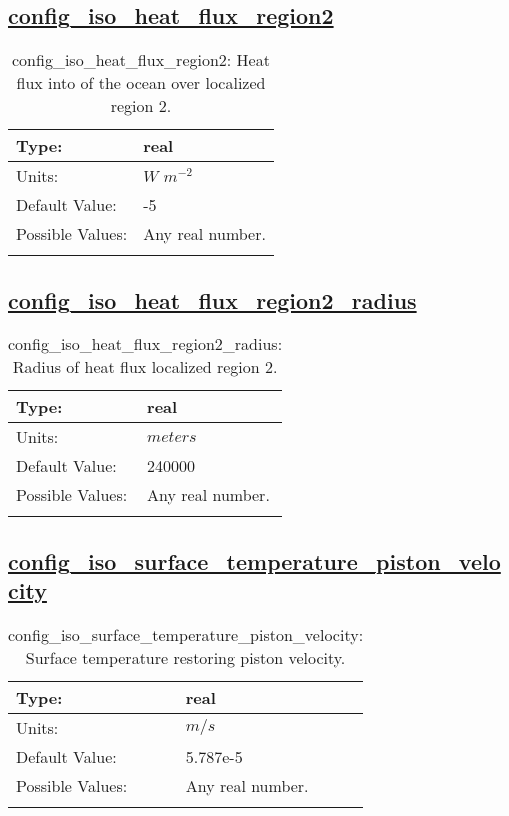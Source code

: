 \subsection[config\_iso\_heat\_flux\_region2]{\hyperref[sec:nm_tab_iso]{config\_iso\_heat\_flux\_region2}}
\label{subsec:nm_sec_config_iso_heat_flux_region2}
\begin{center}
\begin{longtable}{| p{2.0in} || p{4.0in} |}
    \hline
    Type: & real \\
    \hline
    Units: & $W$ $m^{-2}$ \\
    \hline
    Default Value: & -5 \\
    \hline
    Possible Values: & Any real number. \\
    \hline
    \caption{config\_iso\_heat\_flux\_region2: Heat flux into of the ocean over localized region 2.}
\end{longtable}
\end{center}
\subsection[config\_iso\_heat\_flux\_region2\_radius]{\hyperref[sec:nm_tab_iso]{config\_iso\_heat\_flux\_region2\_radius}}
\label{subsec:nm_sec_config_iso_heat_flux_region2_radius}
\begin{center}
\begin{longtable}{| p{2.0in} || p{4.0in} |}
    \hline
    Type: & real \\
    \hline
    Units: & $meters$ \\
    \hline
    Default Value: & 240000 \\
    \hline
    Possible Values: & Any real number. \\
    \hline
    \caption{config\_iso\_heat\_flux\_region2\_radius: Radius of heat flux localized region 2.}
\end{longtable}
\end{center}
\subsection[config\_iso\_surface\_temperature\_piston\_velocity]{\hyperref[sec:nm_tab_iso]{config\_iso\_surface\_temperature\_piston\_velocity}}
\label{subsec:nm_sec_config_iso_surface_temperature_piston_velocity}
\begin{center}
\begin{longtable}{| p{2.0in} || p{4.0in} |}
    \hline
    Type: & real \\
    \hline
    Units: & $m/s$ \\
    \hline
    Default Value: & 5.787e-5 \\
    \hline
    Possible Values: & Any real number. \\
    \hline
    \caption{config\_iso\_surface\_temperature\_piston\_velocity: Surface temperature restoring piston velocity.}
\end{longtable}
\end{center}
